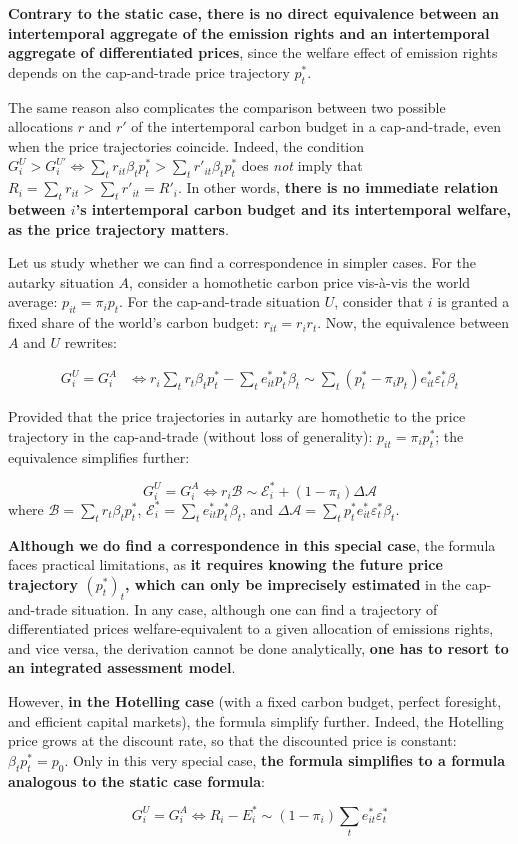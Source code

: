\documentclass[12pt,english]{article}
\begin{document}
\textbf{Contrary to the static case, there is no direct equivalence
between an intertemporal aggregate of the emission rights and an
intertemporal aggregate of differentiated prices}, since the welfare
effect of emission rights depends on the cap-and-trade price trajectory
$p^*_t$.

The same reason also complicates the comparison between two possible
allocations $r$ and $r'$ of the intertemporal carbon budget in a
cap-and-trade, even when the price trajectories coincide. Indeed, the
condition
$G^U_i > G^{U'}_i \Leftrightarrow \sum_t r_{it} \beta_t p^*_t > \sum_t r'_{it} \beta_t p^*_t$
does \emph{not} imply that
$R_i = \sum_t r_{it} > \sum_t r'_{it} = R'_i$. In other words,
\textbf{there is no immediate relation between $i$'s intertemporal
carbon budget and its intertemporal welfare, as the price trajectory
matters}.

Let us study whether we can find a correspondence in simpler cases. For
the autarky situation $A$, consider a homothetic carbon price
vis-à-vis the world average: $p_{it}=\pi_i p_t$. For the cap-and-trade
situation $U$, consider that $i$ is granted a fixed share of the
world's carbon budget: $r_{it}=r_ir_t$. Now, the equivalence between
$A$ and $U$ rewrites:

$$\begin{aligned}
G^U_i = G^A_i &\Leftrightarrow r_i \sum_t r_{t} \beta_t p^*_t - \sum_t e^*_{it} p^*_t \beta_t \sim \sum_t (p^*_t - \pi_i p_t) e^*_{it}  \varepsilon^*_t \beta_t  
\end{aligned}$$

Provided that the price trajectories in autarky are homothetic to the
price trajectory in the cap-and-trade (without loss of generality):
$p_{it}=\pi_i p^*_t$; the equivalence simplifies further:

$$G^U_i = G^A_i \Leftrightarrow r_i \mathscr{B} \sim \mathscr{E}^*_i + (1 - \pi_i) \Delta \mathscr{A}$$
where $\mathscr{B} = \sum_t r_{t} \beta_t p^*_t$,
$\mathscr{E}^*_i = \sum_t e^*_{it} p^*_t \beta_t$, and
$\Delta \mathscr{A} = \sum_t p^*_t e^*_{it}  \varepsilon^*_t \beta_t $.

\textbf{Although we do find a correspondence in this special case}, the
formula faces practical limitations, as \textbf{it requires knowing the
future price trajectory $(p^*_t)_t$, which can only be imprecisely
estimated} in the cap-and-trade situation. In any case, although one can
find a trajectory of differentiated prices welfare-equivalent to a given
allocation of emissions rights, and vice versa, the derivation cannot be
done analytically, \textbf{one has to resort to an integrated assessment
model}.

However, \textbf{in the Hotelling case} (with a fixed carbon budget,
perfect foresight, and efficient capital markets), the formula simplify
further. Indeed, the Hotelling price grows at the discount rate, so that
the discounted price is constant: $\beta_t p^*_t = p_0$. Only in this
very special case, \textbf{the formula simplifies to a formula analogous
to the static case formula}:

$$G^U_i = G^A_i \Leftrightarrow R_i - E^*_i \sim (1 - \pi_i) \sum_t e^*_{it}  \varepsilon^*_t$$
\end{document}

